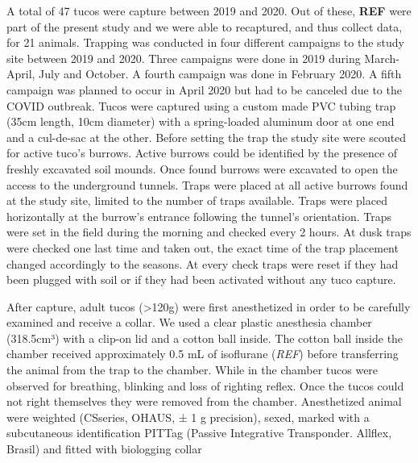 \documentclass[english,msc,numbers,hidelinks]{coppe}
\begin{document}
  A total of 47 tucos were capture between 2019 and 2020. Out of these, \textbf{REF} were part of the present study and we were able to recaptured, and thus collect data, for 21 animals. Trapping was conducted in four different campaigns to the study site between 2019 and 2020. Three campaigns were done in 2019 during March-April, July and October. A fourth campaign was done in February 2020. A fifth campaign was planned to occur in April 2020 but had to be canceled due to the COVID outbreak. Tucos were captured using a custom made PVC tubing trap (35cm length, 10cm diameter) with a spring-loaded aluminum door at one end and a cul-de-sac at the other. Before setting the trap the study site were scouted for active tuco's burrows. Active burrows could be identified by the presence of freshly excavated soil mounds. Once found burrows were excavated to open the access to the underground tunnels. Traps were placed at all active burrows found at the study site, limited to the number of traps available. Traps were placed horizontally at the burrow's entrance following the tunnel's orientation. Traps were set in the field during the morning and checked every 2 hours. At dusk traps were checked one last time and taken out, the exact time of the trap placement changed accordingly to the seasons. At every check traps were reset if they had been plugged with soil or if they had been activated without any tuco capture.

  After capture, adult tucos (\textgreater120g) were first anesthetized in order to be carefully examined and receive a collar. We used a clear plastic anesthesia chamber (318.5cm³) with a clip-on lid and a cotton ball inside. The cotton ball inside the chamber received approximately 0.5 mL of isoflurane (\emph{REF}) before transferring the animal from the trap to the chamber. While in the chamber tucos were observed for breathing, blinking and loss of righting reflex. Once the tucos could not right themselves they were removed from the chamber. Anesthetized animal were weighted (CSseries, OHAUS, ± 1 g precision), sexed, marked with a subcutaneous identification PITTag (Passive Integrative Transponder. Allflex, Brasil) and fitted with biologging collar
\end{document}
